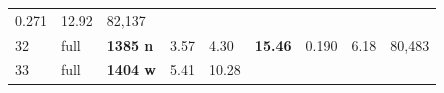 \documentclass[
  10pt, ]{article}
\begin{document}
\begin{longtable}[]{@{}lllllllll@{}}
\begin{minipage}[t]{0.08\columnwidth}
0.271\strut
\end{minipage} & \begin{minipage}[t]{0.08\columnwidth}\raggedright
12.92\strut
\end{minipage} & \begin{minipage}[t]{0.08\columnwidth}\raggedright
82,137\strut
\end{minipage}\tabularnewline
\begin{minipage}[t]{0.08\columnwidth}\raggedright
32\strut
\end{minipage} & \begin{minipage}[t]{0.08\columnwidth}\raggedright
full\strut
\end{minipage} & \begin{minipage}[t]{0.08\columnwidth}\raggedright
\textbf{1385 n}\strut
\end{minipage} & \begin{minipage}[t]{0.08\columnwidth}\raggedright
3.57\strut
\end{minipage} & \begin{minipage}[t]{0.08\columnwidth}\raggedright
4.30\strut
\end{minipage} & \begin{minipage}[t]{0.08\columnwidth}\raggedright
\textbf{15.46}\strut
\end{minipage} & \begin{minipage}[t]{0.08\columnwidth}\raggedright
0.190\strut
\end{minipage} & \begin{minipage}[t]{0.08\columnwidth}\raggedright
6.18\strut
\end{minipage} & \begin{minipage}[t]{0.08\columnwidth}\raggedright
80,483\strut
\end{minipage}\tabularnewline
\begin{minipage}[t]{0.08\columnwidth}\raggedright
33\strut
\end{minipage} & \begin{minipage}[t]{0.08\columnwidth}\raggedright
full\strut
\end{minipage} & \begin{minipage}[t]{0.08\columnwidth}\raggedright
\textbf{1404 w}\strut
\end{minipage} & \begin{minipage}[t]{0.08\columnwidth}\raggedright
5.41\strut
\end{minipage} & \begin{minipage}[t]{0.08\columnwidth}\raggedright
10.28\strut

\end{minipage}
\end{longtable}
\end{document}
